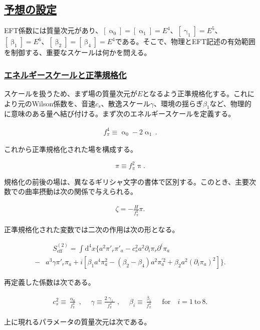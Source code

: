 \documentclass[a4paper,11pt]{ltjsarticle}
\newcommand{\subsectionlink}[1]{\subsection[#1]{\hyperlink{toc}{#1}}}
\numberwithin{equation}{section}
\newcommand{\subsubsectionlink}[1]{\subsubsection[#1]{\hyperlink{toc}{#1}}}
\def\pia{\pi_{a}}
\def\pir{\pi_{r}}
\newcommand{\dd}{\mathrm{d}}
\begin{document}
\subsectionlink{予想の設定}\label{subsec:energy}

EFT係数には質量次元があり、$[\upalpha_0]=[\upalpha_1]=E^4$、$[\upgamma_1]=E^5$、$[\upbeta_1]=E^6$、$[\upbeta_2]=[\upbeta_4]=E^4$である。そこで、物理とEFT記述の有効範囲を制御する、重要なスケールは何かを問える。

\subsubsectionlink{エネルギースケールと正準規格化}

スケールを扱うため、まず場の質量次元が$E$となるよう正準規格化する。これにより元のWilson係数を、音速$c_s$、散逸スケール$\gamma$、環境の揺らぎ$\beta_1$など、物理的に意味のある量へ結び付ける。まず次のエネルギースケールを定義する。

\begin{align}
f_\pi^4 \equiv \upalpha_0 -2 \upalpha_1\,.
\end{align}

これから正準規格化された場を構成する。

\begin{equation}\label{eq:can}
\pi \equiv f_\pi^2 \uppi.
\end{equation}

規格化の前後の場は、異なるギリシャ文字の書体で区別する。このとき、主要次数での曲率摂動は次の関係で与えられる。

\begin{align}\label{eq:zetarel}
\zeta =  - \frac{H}{f_\pi^2} \pi.
\end{align}

正準規格化された変数では二次の作用は次の形となる。

\begin{align}\label{eq:canonorm} 
&\quad S_{\mathrm{eff}}^{(2)} = \int \dd^4 x \Big\{ a^2 \pi'_{r} \pi'_{a} - c_{s}^{2} a^2 \partial_i \pir  \partial^i \pia  \\
-&  a^3 \gamma \pi'_{r} \pia + i \left[\beta_{1} a^4 \pia^2 - \left(\beta_2 - \beta_4\right) a^2\pia^{\prime 2} + \beta_2 a^2 \left(\partial_i \pia \right)^2\right] \Big\}. \nonumber
\end{align}

再定義した係数は次である。

\begin{align}
c_s^{2} \equiv \frac{\upalpha_{0}}{f_\pi^4}\;,\quad\; \gamma \equiv
\frac{2\upgamma_{1}}{f_\pi^4}\;,\quad\;\beta_{i} \equiv \frac{\upbeta_{i}}{f_{\pi}^{4}}\;\quad\mathrm{for}\quad i = 1 ~\mathrm{to}~8.
\end{align}

上に現れるパラメータの質量次元は次である。
\end{document}
